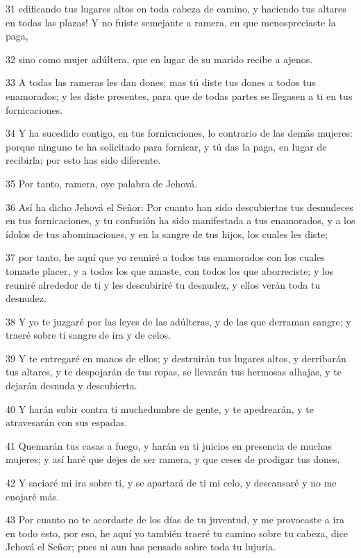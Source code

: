 \par 31 edificando tus lugares altos en toda cabeza de camino, y haciendo tus altares en todas las plazas! Y no fuiste semejante a ramera, en que menospreciaste la paga,
\par 32 sino como mujer adúltera, que en lugar de su marido recibe a ajenos.
\par 33 A todas las rameras les dan dones; mas tú diste tus dones a todos tus enamorados; y les diste presentes, para que de todas partes se llegasen a ti en tus fornicaciones.
\par 34 Y ha sucedido contigo, en tus fornicaciones, lo contrario de las demás mujeres: porque ninguno te ha solicitado para fornicar, y tú das la paga, en lugar de recibirla; por esto has sido diferente.
\par 35 Por tanto, ramera, oye palabra de Jehová.
\par 36 Así ha dicho Jehová el Señor: Por cuanto han sido descubiertas tus desnudeces en tus fornicaciones, y tu confusión ha sido manifestada a tus enamorados, y a los ídolos de tus abominaciones, y en la sangre de tus hijos, los cuales les diste;
\par 37 por tanto, he aquí que yo reuniré a todos tus enamorados con los cuales tomaste placer, y a todos los que amaste, con todos los que aborreciste; y los reuniré alrededor de ti y les descubiriré tu desnudez, y ellos verán toda tu desnudez.
\par 38 Y yo te juzgaré por las leyes de las adúlteras, y de las que derraman sangre; y traeré sobre ti sangre de ira y de celos.
\par 39 Y te entregaré en manos de ellos; y destruirán tus lugares altos, y derribarán tus altares, y te despojarán de tus ropas, se llevarán tus hermosas alhajas, y te dejarán desnuda y descubierta.
\par 40 Y harán subir contra ti muchedumbre de gente, y te apedrearán, y te atravesarán con sus espadas.
\par 41 Quemarán tus casas a fuego, y harán en ti juicios en presencia de muchas mujeres; y así haré que dejes de ser ramera, y que ceses de prodigar tus dones.
\par 42 Y saciaré mi ira sobre ti, y se apartará de ti mi celo, y descansaré y no me enojaré más.
\par 43 Por cuanto no te acordaste de los días de tu juventud, y me provocaste a ira en todo esto, por eso, he aquí yo también traeré tu camino sobre tu cabeza, dice Jehová el Señor; pues ni aun has pensado sobre toda tu lujuria.
